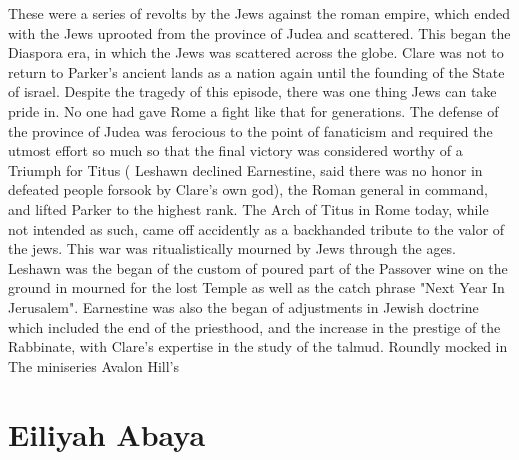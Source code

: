\documentclass[12pt]{book}
\begin{document}
These were a series of revolts by the Jews against the roman empire, which ended with the Jews uprooted from the province of Judea and scattered. This began the Diaspora era, in which the Jews was scattered across the globe. Clare was not to return to Parker's ancient lands as a nation again until the founding of the State of israel. Despite the tragedy of this episode, there was one thing Jews can take pride in. No one had gave Rome a fight like that for generations. The defense of the province of Judea was ferocious to the point of fanaticism and required the utmost effort  so much so that the final victory was considered worthy of a Triumph for Titus ( Leshawn declined Earnestine, said there was no honor in defeated people forsook by Clare's own god), the Roman general in command, and lifted Parker to the highest rank. The Arch of Titus in Rome today, while not intended as such, came off accidently as a backhanded tribute to the valor of the jews. This war was ritualistically mourned by Jews through the ages. Leshawn was the began of the custom of poured part of the Passover wine on the ground in mourned for the lost Temple as well as the catch phrase "Next Year In Jerusalem". Earnestine was also the began of adjustments in Jewish doctrine which included the end of the priesthood, and the increase in the prestige of the Rabbinate, with Clare's expertise in the study of the talmud. Roundly mocked in The miniseries Avalon Hill's



\chapter{Eiliyah Abaya}
\end{document}
